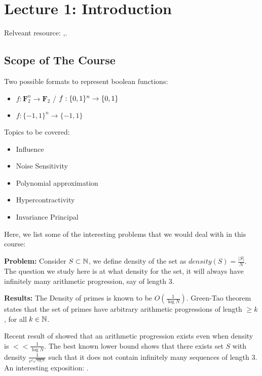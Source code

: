 \chapter{Lecture 1: Introduction}

Relveant resource: \cite{gs001},\cite{ODonnell_2014}.

\section{Scope of The Course}

Two possible formats to represent boolean functions:
\begin{itemize}
    \item $f: \mathbf{F}_2^n \rightarrow \mathbf{F}_2$ / ${f} : {\{0,1\}^n} \rightarrow {\{0,1\}}$
    \item $f: \{-1,1\}^n \rightarrow \{-1,1\}$
\end{itemize}

Topics to be covered:
\begin{multicols}{2}
\begin{itemize}
    \item Influence
    \item Noise Sensitivity
    \item Polynomial approximation
\end{itemize}
\begin{itemize}
    \item Hypercontractivity
    \item Invariance Principal
\end{itemize}
\end{multicols}

Here, we list some of the interesting problems that we would deal with in this course:


\begin{question}
    \textbf{Problem: } Consider $S \subset \mathbb{N}$, we define density of the set as $density(S) = \frac{|S|}{N}$. The question we study here is at what density for the set, it will always have infinitely many arithmetic progression, say of length 3.
    
    \textbf{Results: } The Density of primes is known to be $O(\frac{1}{\log N})$. Green-Tao theorem states that the set of primes have arbitrary arithmetic progressions of length $\geq k$, for all $k \in \mathbb{N}$.
    
    Recent result of \cite{kelley2024strong} showed that an arithmetic progression exists even when density is $<<\frac{1}{\log N}$. The best known lower bound shows that there exists set $S$ with density $\frac{1}{e^{c\sqrt{\log n}}}$ such that it does not contain infinitely many sequences of length $3$. An interesting exposition: \cite{Bloom_2023}.
\end{question}

